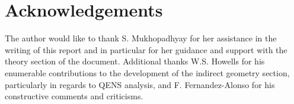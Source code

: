 \documentclass[paper=a4, fontsize=11pt]{scrartcl}	%
\numberwithin{equation}{section}															%
\numberwithin{figure}{section}																%
\numberwithin{table}{section}																%
\begin{document}
\clearpage
\section*{Acknowledgements}
The author would like to thank S. Mukhopadhyay for her assistance in the writing of this report and in particular for her guidance and support with the theory section of the document. Additional thanks W.S. Howells for his enumerable contributions to the development of the indirect geometry section, particularly in regards to QENS analysis, and F. Fernandez-Alonso for his constructive comments and criticisms.

\clearpage


\end{document}
